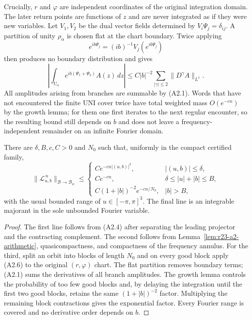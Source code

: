 Crucially, $r$ and $\varphi$ are independent coordinates of the original
integration domain.  The later return points are functions of $z$ and are
never integrated as if they were new variables.  Let $V_1,V_2$ be the dual
vector fields determined by
$V_i\Psi_j=\delta_{ij}$.  A partition of unity $\rho_\alpha$ is chosen flat at
the chart boundary.  Twice applying
\[
 e^{ib\Psi_j}=(ib)^{-1}V_j(e^{ib\Psi_j})
\]
then produces no boundary distribution and gives
\[
 \left|\int_{U_\alpha}e^{ib(\Psi_1+\Psi_2)}A(z)\,dz\right|
 \le C|b|^{-2}\sum_{|\gamma|\le2}\|D^\gamma A\|_{L^1}.   \tag{A2.6}
\]
All amplitudes arising from branches are summable by (A2.1).  Words that have
not encountered the finite UNI cover twice have total weighted mass
$O(e^{-cn})$ by the growth lemma; for them one first iterates to the next
regular encounter, so the resulting bound still depends on $b$ and does not
leave a frequency-independent remainder on an infinite Fourier domain.

\begin{theorem}
\label{thm:r23-a2-fourier}
There are $\delta,B,c,C>0$ and $N_0$ such that, uniformly in the compact
certified family,
\[
 \|\mathcal L_{u,b}^{\,n}\|_{\mathcal B\to\mathcal B_w}
 \le
 \begin{cases}
 C e^{-c n|(u,b)|^2},& |(u,b)|\le\delta,\\
 C e^{-cn},& \delta\le |u|+|b|\le B,\\
 C(1+|b|)^{-2}e^{-cn/N_0},& |b|>B,
 \end{cases}                                             \tag{A2.7}
\]
with the usual bounded range of $u\in[-\pi,\pi]^3$.  The final line is an
integrable majorant in the sole unbounded Fourier variable.
\end{theorem}

\begin{proof}
The first line follows from (A2.4) after separating the leading projector and
the contracting complement.  The second follows from
Lemma~\ref{lem:r23-a2-arithmetic}, quasicompactness, and compactness of the
frequency annulus.  For the third, split an orbit into blocks of length
$N_0$ and on every good block apply (A2.6) to the original $(r,\varphi)$
chart.  The flat partition removes boundary terms; (A2.1) sums the derivatives
of all branch amplitudes.  The growth lemma controls the probability of too
few good blocks and, by delaying the integration until the first two good
blocks, retains the same $(1+|b|)^{-2}$ factor.  Multiplying the remaining
block contractions gives the exponential factor.  Every Fourier range is
covered and no derivative order depends on $b$.
\end{proof}

